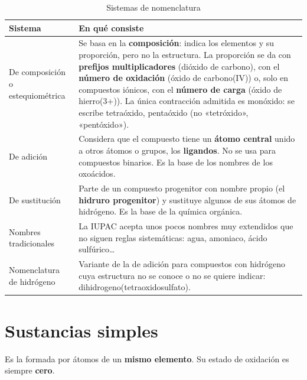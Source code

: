 \begin{table}[H]
    \centering
    \caption{Sistemas de nomenclatura}
    \vspace{-5pt}
    \begin{tabular}{@{}L{3.2cm}L{11cm}@{}}
        \toprule
        \textbf{Sistema} & \textbf{En qué consiste} \\
        \midrule
        De composición o estequiométrica & Se basa en la \textbf{composición}: indica los elementos y su proporción, pero no la
        estructura. La proporción se da con \textbf{prefijos multiplicadores} (dióxido de carbono), con el \textbf{número de
        oxidación} (óxido de carbono(IV)) o, solo en compuestos iónicos, con el \textbf{número de carga} (óxido de hierro(3+)). La
        única contracción admitida es monóxido: se escribe tetraóxido, pentaóxido (no «tetróxido», «pentóxido»). \\[3pt]
        De adición & Considera que el compuesto tiene un \textbf{átomo central} unido a otros átomos o grupos, los
        \textbf{ligandos}. No se usa para compuestos binarios. Es la base de los nombres de los oxoácidos. \\[3pt]
        De sustitución & Parte de un compuesto progenitor con nombre propio (el \textbf{hidruro progenitor}) y sustituye
        algunos de sus átomos de hidrógeno. Es la base de la química orgánica. \\[3pt]
        Nombres tradicionales & La IUPAC acepta unos pocos nombres muy extendidos que no siguen reglas sistemáticas: agua,
        amoniaco, ácido sulfúrico… \\[3pt]
        Nomenclatura de hidrógeno & Variante de la de adición para compuestos con hidrógeno cuya estructura no se conoce o no se
        quiere indicar: dihidrogeno(tetraoxidosulfato). \\
        \bottomrule
    \end{tabular}
    \label{tab:ud5-sistemas}
\end{table}

\section{Sustancias simples}\label{sec:ud5-simples}

\begin{definition}
    Es la formada por átomos de un \textbf{mismo elemento}. Su estado de oxidación es siempre \textbf{cero}.
\end{definition}

